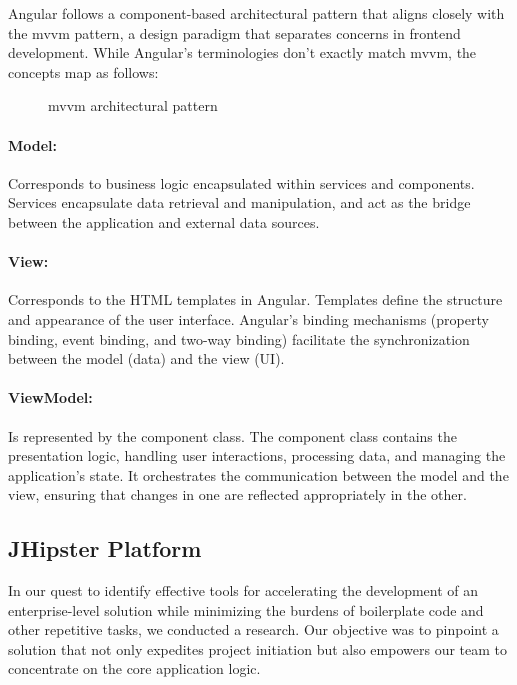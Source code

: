 Angular follows a component-based architectural pattern that aligns closely with the
\acrfull{mvvm} pattern, a design paradigm that separates concerns in frontend
development. While Angular's terminologies don't exactly match \acrshort{mvvm},
the concepts map as follows: \\

\begin{figure}[hbt!]
      \centering
      
      \caption{\acrshort{mvvm} architectural pattern}
      \label{mvvm}
\end{figure}

\paragraph{Model:} Corresponds to business logic encapsulated within services and components.
Services encapsulate data retrieval and manipulation, and act as the bridge between
the application and external data sources.

\paragraph{View:} Corresponds to the HTML templates in Angular. Templates define the structure and
appearance of the user interface. Angular's binding mechanisms (property binding, event binding,
and two-way binding) facilitate the synchronization between the model (data) and the view (UI).

\paragraph{ViewModel:} Is represented by the component class. The component class contains
the presentation logic, handling user interactions, processing data, and managing the application's state.
It orchestrates the communication between the model and the view, ensuring that changes in one are
reflected appropriately in the other.

\subsection{JHipster Platform}
In our quest to identify effective tools for accelerating the development of an enterprise-level solution
while minimizing the burdens of boilerplate code and other repetitive tasks, we conducted a research.
Our objective was to pinpoint a solution that not only expedites project initiation but also empowers
our team to concentrate on the core application logic.

